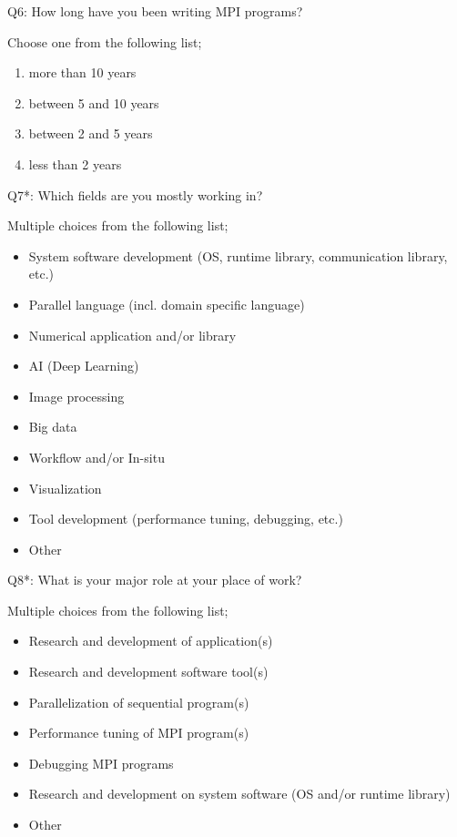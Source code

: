 \begin{description}
\item{Q6:} How long have you been writing MPI programs?

Choose one from the following list;
\begin{enumerate}
\item more than 10 years
\item between 5 and 10 years
\item between 2 and 5 years
\item less than 2 years
\end{enumerate}

\item{Q7*:} Which fields are you mostly working in?

Multiple choices from the following list;
\begin{itemize}
\item System software development (OS, runtime library, communication library, etc.)
\item Parallel language (incl. domain specific language)
\item Numerical application and/or library
\item AI (Deep Learning)
\item Image processing
\item Big data
\item Workflow and/or In-situ
\item Visualization
\item Tool development (performance tuning, debugging, etc.)
\item Other
\end{itemize}

\item{Q8*:} What is your major role at your place of work?

Multiple choices from the following list;
\begin{itemize}
\item Research and development of application(s)
\item Research and development software tool(s)
\item Parallelization of sequential program(s)
\item Performance tuning of MPI program(s)
\item Debugging MPI programs
\item Research and development on system software (OS and/or runtime library)
\item Other
\end{itemize}


\end{description}
